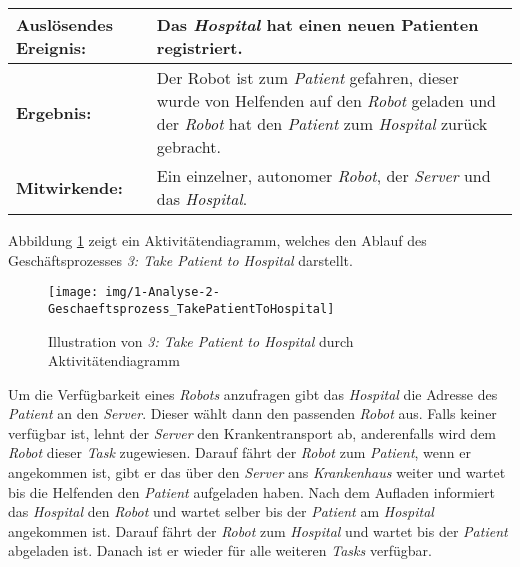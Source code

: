 			\begin{table}[H]
				\centering
				\begin{tabularx}{\textwidth}{@{}p{3cm}X@{}}
				\toprule
				\textbf{Auslösendes Ereignis:} & Das \emph{Hospital} hat einen neuen Patienten registriert.\\ \midrule
				\textbf{Ergebnis:} & Der Robot ist zum \emph{Patient} gefahren, dieser wurde von Helfenden auf den \emph{Robot} geladen 
				und der \emph{Robot} hat den \emph{Patient} zum \emph{Hospital} zurück gebracht.\\ \midrule
				\textbf{Mitwirkende:} &	Ein einzelner, autonomer \emph{Robot}, der \emph{Server} und das \emph{Hospital}. \\
				\bottomrule
				\end{tabularx}
				\label{tab:2-4-take-patient-to-hospital}
			\end{table}

			Abbildung \ref{fig:2-4-take-patient-to-hospital-aktivitaetendiagramm} zeigt ein Aktivitätendiagramm, welches den Ablauf des Geschäftsprozesses \emph{3: Take Patient to Hospital} darstellt.

			\begin{figure}[H]
				\centering
				\texttt{[image: img/1-Analyse-2-Geschaeftsprozess\_TakePatientToHospital]}
				\caption{Illustration von \emph{3: Take Patient to Hospital} durch Aktivitätendiagramm}
				\label{fig:2-4-take-patient-to-hospital-aktivitaetendiagramm}
			\end{figure}

			Um die Verfügbarkeit eines \emph{Robots} anzufragen gibt das \emph{Hospital} die Adresse des \emph{Patient} an den \emph{Server}. Dieser wählt dann den passenden \emph{Robot} aus. Falls keiner verfügbar ist, lehnt der \emph{Server} den Krankentransport ab, anderenfalls wird dem \emph{Robot} dieser \emph{Task} zugewiesen. Darauf fährt der \emph{Robot} zum \emph{Patient}, wenn er angekommen ist, gibt er das über den \emph{Server} ans \emph{Krankenhaus} weiter und wartet bis die Helfenden den \emph{Patient} aufgeladen haben. Nach dem Aufladen informiert das \emph{Hospital} den \emph{Robot} und wartet selber bis der \emph{Patient} am \emph{Hospital} angekommen ist. Darauf fährt der \emph{Robot} zum \emph{Hospital} und wartet bis der \emph{Patient} abgeladen ist. Danach ist er wieder für alle weiteren \emph{Tasks} verfügbar.

	\pagebreak

	